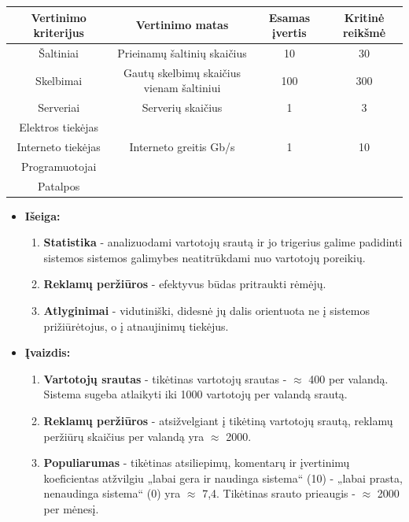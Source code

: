 \documentclass[12pt]{article}
\begin{document}
	\begin{center}
		\begin{tabular}{ | c | c | c | c |}
			\hline
			Vertinimo kriterijus & Vertinimo matas & Esamas įvertis & Kritinė reikšmė \\ \hline
			Šaltiniai & Prieinamų šaltinių skaičius & 10 & 30\\ \hline
			Skelbimai & Gautų skelbimų skaičius vienam šaltiniui & 100 & 300\\ \hline
			Serveriai & Serverių skaičius & 1 & 3 \\ \hline
			Elektros tiekėjas &  &  & \\ \hline
			Interneto tiekėjas & Interneto greitis Gb/s & 1 & 10 \\ \hline
			Programuotojai &  &  & \\ \hline
			Patalpos &  &  & \\ \hline
		\end{tabular}
	\end{center}

	\begin{itemize}
	\item{\textbf{Išeiga:}}
	\begin{enumerate}
		\item{\textbf{Statistika} - analizuodami vartotojų srautą ir jo trigerius galime padidinti sistemos sistemos galimybes neatitrūkdami nuo vartotojų poreikių.}
		\item{\textbf{Reklamų peržiūros} - efektyvus būdas pritraukti rėmėjų.}
		\item{\textbf{Atlyginimai} - vidutiniški, didesnė jų dalis orientuota ne į sistemos prižiūrėtojus, o į atnaujinimų tiekėjus.}
	\end{enumerate}
	\pagebreak
	\end{itemize}

	\begin{itemize}
	
	\item{\textbf{Įvaizdis:}}
	\begin{enumerate}
		\item{\textbf{Vartotojų srautas} - tikėtinas vartotojų srautas - $\approx$ 400 per valandą. Sistema sugeba atlaikyti iki 1000 vartotojų per valandą srautą.}
		\item{\textbf{Reklamų peržiūros} - atsižvelgiant į tikėtiną vartotojų srautą, reklamų peržiūrų skaičius per valandą yra $\approx$ 2000.}
		\item{\textbf{Populiarumas} - tikėtinas atsiliepimų, komentarų ir įvertinimų koeficientas atžvilgiu „labai gera ir naudinga sistema“ (10) - „labai prasta, nenaudinga sistema“ (0) yra $\approx$ 7,4. Tikėtinas srauto prieaugis - $\approx$ 2000 per mėnesį.}
	\end{enumerate}
	\end{itemize}
\end{document}
